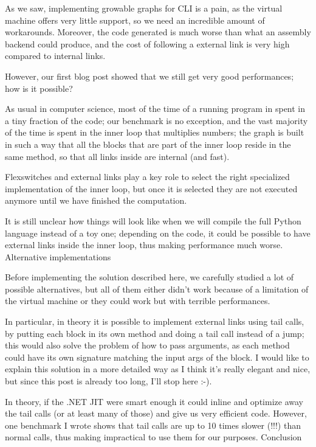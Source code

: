 {As we saw, implementing growable graphs for CLI is a pain, as the virtual machine offers very little support, so we need an incredible amount of workarounds. Moreover, the code generated is much worse than what an assembly backend could produce, and the cost of following a external link is very high compared to internal links.

However, our first blog post showed that we still get very good performances; how is it possible?

As usual in computer science, most of the time of a running program in spent in a tiny fraction of the code; our benchmark is no exception, and the vast majority of the time is spent in the inner loop that multiplies numbers; the graph is built in such a way that all the blocks that are part of the inner loop reside in the same method, so that all links inside are internal (and fast).

Flexswitches and external links play a key role to select the right specialized implementation of the inner loop, but once it is selected they are not executed anymore until we have finished the computation.

It is still unclear how things will look like when we will compile the full Python language instead of a toy one; depending on the code, it could be possible to have external links inside the inner loop, thus making performance much worse.
Alternative implementations

Before implementing the solution described here, we carefully studied a lot of possible alternatives, but all of them either didn't work because of a limitation of the virtual machine or they could work but with terrible performances.

In particular, in theory it is possible to implement external links using tail calls, by putting each block in its own method and doing a tail call instead of a jump; this would also solve the problem of how to pass arguments, as each method could have its own signature matching the input args of the block. I would like to explain this solution in a more detailed way as I think it's really elegant and nice, but since this post is already too long, I'll stop here :-).

In theory, if the .NET JIT were smart enough it could inline and optimize away the tail calls (or at least many of those) and give us very efficient code. However, one benchmark I wrote shows that tail calls are up to 10 times slower (!!!) than normal calls, thus making impractical to use them for our purposes.
Conclusion

}
